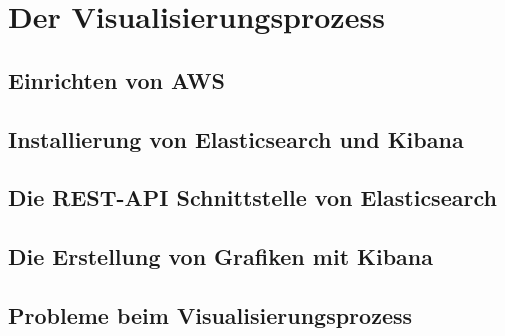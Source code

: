 \chapter{Der Visualisierungsprozess}
\section{Einrichten von AWS}
\section{Installierung von Elasticsearch und Kibana}
\section{Die REST-API Schnittstelle von Elasticsearch}
\section{Die Erstellung von Grafiken mit Kibana}
\section{Probleme beim Visualisierungsprozess}